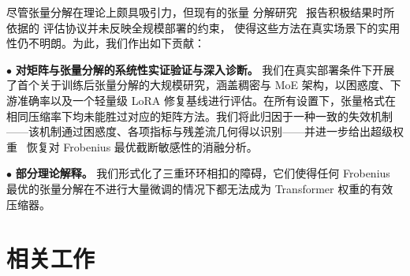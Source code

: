 
尽管张量分解在理论上颇具吸引力，但现有的张量
分解研究~\citep{tensorllm2025,li2026lestd} 报告积极结果时所依据的
评估协议并未反映全规模部署的约束，
使得这些方法在真实场景下的实用性仍不明朗。为此，我们作出如下贡献：

$\bullet$ \textbf{对矩阵与张量分解的系统性实证验证与深入诊断。} 我们在真实部署条件下开展了首个关于训练后张量分解的大规模研究，涵盖稠密与 MoE 架构，以困惑度、下游准确率以及一个轻量级 LoRA 修复基线进行评估。在所有设置下，张量格式在相同压缩率下均未能胜过对应的矩阵方法。我们将此归因于一种一致的失效机制——该机制通过困惑度、各项指标与残差流几何得以识别——并进一步给出超级权重~\citep{superweight} 恢复对 Frobenius 最优截断敏感性的消融分析。

$\bullet$ \textbf{部分理论解释。} 我们形式化了三重环环相扣的障碍，它们使得任何 Frobenius 最优的张量分解在不进行大量微调的情况下都无法成为 Transformer 权重的有效压缩器。

\section{相关工作}

